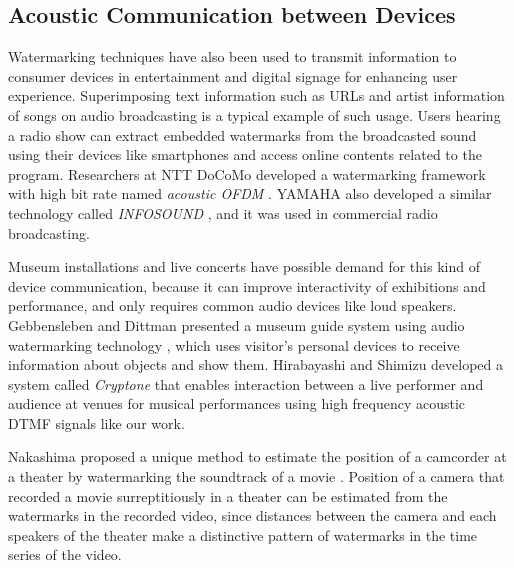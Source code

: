 \subsection{Acoustic Communication between Devices}
Watermarking techniques have also been used to transmit information to consumer devices in entertainment and digital signage for enhancing user experience.
Superimposing text information such as URLs and artist information of songs on audio broadcasting is a typical example of such usage.
Users hearing a radio show can extract embedded watermarks from the broadcasted sound using their devices like smartphones and access online contents related to the program.
Researchers at NTT DoCoMo developed a watermarking framework with high bit rate named {\it acoustic OFDM} \cite{matsuoka2008acoustic}. YAMAHA also developed a similar technology called {\it INFOSOUND} \cite{infosound}, and it was used in commercial radio broadcasting.

Museum installations and live concerts have possible demand for this kind of device communication, because it can improve interactivity of exhibitions and performance, and only requires common audio devices like loud speakers.
Gebbensleben and Dittman presented a museum guide system using audio watermarking technology \cite{gebbensleben2006multimodal}, which uses visitor's personal devices to receive information about objects and show them.
Hirabayashi and Shimizu developed a system called {\it Cryptone} that enables interaction between a live performer and audience at venues for musical performances using high frequency acoustic DTMF signals like our work. \cite{Hirabayashi:2012:CIP:2407707.2407712}

Nakashima proposed a unique method to estimate the position of a camcorder at a theater by watermarking the soundtrack of a movie \cite{nakashima2009watermarked}.
Position of a camera that recorded a movie surreptitiously in a theater can be estimated from the watermarks in the recorded video, since distances between the camera and each speakers of the theater make a distinctive pattern of watermarks in the time series of the video.

